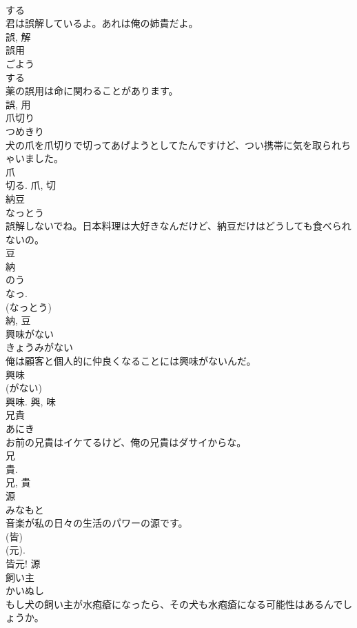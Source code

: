 \documentclass[8pt]{extreport}
\begin{document}
\begin{CJK}{UTF8}{min}
\\	する 
\\	君は誤解しているよ。あれは俺の姉貴だよ。	
\\	誤, 解	
\\	誤用	
\\	ごよう	
\\	する 
\\	薬の誤用は命に関わることがあります。	
\\	誤, 用	
\\	爪切り	
\\	つめきり	
\\	犬の爪を爪切りで切ってあげようとしてたんですけど、つい携帯に気を取られちゃいました。	
\\	爪 
\\	切る.	爪, 切	
\\	納豆	
\\	なっとう	
\\	誤解しないでね。日本料理は大好きなんだけど、納豆だけはどうしても食べられないの。	
\\	豆 
\\	納 
\\	のう 
\\	なっ. 
\\	(なっとう) 
\\	納, 豆	
\\	興味がない	
\\	きょうみがない	
\\	俺は顧客と個人的に仲良くなることには興味がないんだ。	
\\	興味 
\\	(がない) 
\\	興味.	興, 味	
\\	兄貴	
\\	あにき	
\\	お前の兄貴はイケてるけど、俺の兄貴はダサイからな。	
\\	兄 
\\	貴. 
\\	兄, 貴	
\\	源	
\\	みなもと	
\\	音楽が私の日々の生活のパワーの源です。	
\\	(皆) 
\\	(元). 
\\	皆元!	源	
\\	飼い主	
\\	かいぬし	
\\	もし犬の飼い主が水疱瘡になったら、その犬も水疱瘡になる可能性はあるんでしょうか。	

\end{CJK}
\end{document}

